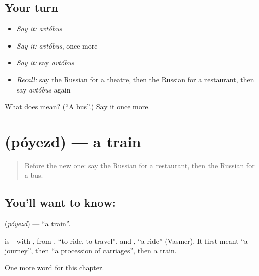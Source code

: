 \subsection*{Your turn}
\begin{itemize}
\raggedright
  \item \emph{Say it:} \emph{avtóbus}
  \item \emph{Say it:} \emph{avtóbus}, once more
  \item \emph{Say it:} say \emph{avtóbus}
  \item \emph{Recall:} say the Russian for a theatre, then the Russian for a restaurant, then say \emph{avtóbus} again
\end{itemize}

\begin{tcolorbox}[breakable,colback=teal!4,colframe=teal!35!black,title={Before you move on}]
What does  mean? (\textquotedblleft{}A bus\textquotedblright{}.) Say it once more.
\end{tcolorbox}
\section[\texorpdfstring{\ru{поезд} (póyezd)}{поезд (póyezd)}]{ (póyezd) — a train}

\label{lesson:RU-C79-train}



\begin{quote}
Before the new one: say the Russian for a restaurant, then the Russian for a bus.
\end{quote}

\subsection*{You'll want to know: }
\textbf{} (\emph{póyezd}) — \textquotedblleft{}a train\textquotedblright{}.

\begin{cousinweb}
\textbf{} is \emph{-} with \emph{}, from \emph{}, \textquotedblleft{}to ride, to travel\textquotedblright{}, and \emph{}, \textquotedblleft{}a ride\textquotedblright{} (Vasmer). It first meant \textquotedblleft{}a journey\textquotedblright{}, then \textquotedblleft{}a procession of carriages\textquotedblright{}, then a train.
\end{cousinweb}

\begin{grammarlens}[title={What you've built}]
One more word for this chapter.
\end{grammarlens}

